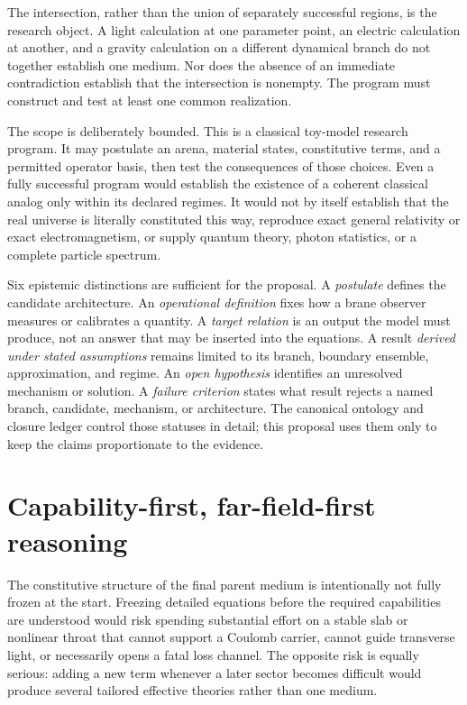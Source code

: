 The intersection, rather than the union of separately successful regions, is
the research object. A light calculation at one parameter point, an electric
calculation at another, and a gravity calculation on a different dynamical
branch do not together establish one medium. Nor does the absence of an
immediate contradiction establish that the intersection is nonempty. The
program must construct and test at least one common realization.

The scope is deliberately bounded. This is a classical toy-model research
program. It may postulate an arena, material states, constitutive terms, and a
permitted operator basis, then test the consequences of those choices. Even a
fully successful program would establish the existence of a coherent classical
analog only within its declared regimes. It would not by itself establish that
the real universe is literally constituted this way, reproduce exact general
relativity or exact electromagnetism, or supply quantum theory, photon
statistics, or a complete particle spectrum.

Six epistemic distinctions are sufficient for the proposal. A
\emph{postulate} defines the candidate architecture. An \emph{operational
definition} fixes how a brane observer measures or calibrates a quantity. A
\emph{target relation} is an output the model must produce, not an answer that
may be inserted into the equations. A result \emph{derived under stated
assumptions} remains limited to its branch, boundary ensemble, approximation,
and regime. An \emph{open hypothesis} identifies an unresolved mechanism or
solution. A \emph{failure criterion} states what result rejects a named branch,
candidate, mechanism, or architecture. The canonical ontology and closure
ledger control those statuses in detail; this proposal uses them only to keep
the claims proportionate to the evidence.

\section{Capability-first, far-field-first reasoning}

The constitutive structure of the final parent medium is intentionally not
fully frozen at the start. Freezing detailed equations before the required
capabilities are understood would risk spending substantial effort on a stable
slab or nonlinear throat that cannot support a Coulomb carrier, cannot guide
transverse light, or necessarily opens a fatal loss channel. The opposite risk
is equally serious: adding a new term whenever a later sector becomes difficult
would produce several tailored effective theories rather than one medium.

